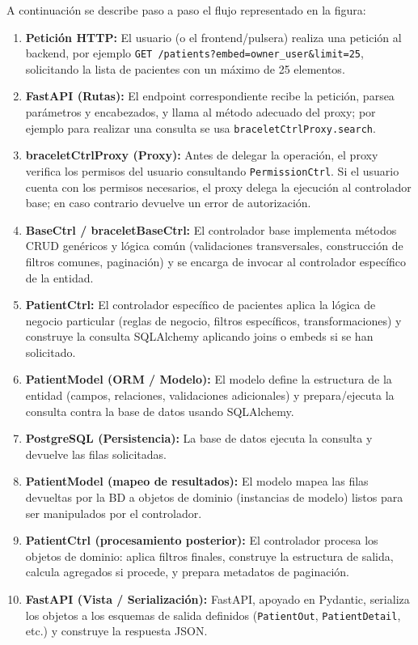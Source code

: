 \documentclass[12pt, a4paper]{article}
\begin{document}
A continuación se describe paso a paso el flujo representado en la figura:

\begin{enumerate}
	\item \textbf{Petición HTTP:} El usuario (o el frontend/pulsera) realiza una petición al backend, por ejemplo \texttt{GET /patients?embed=owner\_user\&limit=25}, solicitando la lista de pacientes con un máximo de 25 elementos.
	\item \textbf{FastAPI (Rutas):} El endpoint correspondiente recibe la petición, parsea parámetros y encabezados, y llama al método adecuado del proxy; por ejemplo para realizar una consulta se usa  \verb|braceletCtrlProxy.search|.
	\item \textbf{braceletCtrlProxy (Proxy):} Antes de delegar la operación, el proxy verifica los permisos del usuario consultando \texttt{PermissionCtrl}. Si el usuario cuenta con los permisos necesarios, el proxy delega la ejecución al controlador base; en caso contrario devuelve un error de autorización.
	\item \textbf{BaseCtrl / braceletBaseCtrl:} El controlador base implementa métodos CRUD genéricos y lógica común (validaciones transversales, construcción de filtros comunes, paginación) y se encarga de invocar al controlador específico de la entidad.
	\item \textbf{PatientCtrl:} El controlador específico de pacientes aplica la lógica de negocio particular (reglas de negocio, filtros específicos, transformaciones) y construye la consulta SQLAlchemy aplicando joins o embeds si se han solicitado.
	\item \textbf{PatientModel (ORM / Modelo):} El modelo define la estructura de la entidad (campos, relaciones, validaciones adicionales) y prepara/ejecuta la consulta contra la base de datos usando SQLAlchemy.
	\item \textbf{PostgreSQL (Persistencia):} La base de datos ejecuta la consulta y devuelve las filas solicitadas.
	\item \textbf{PatientModel (mapeo de resultados):} El modelo mapea las filas devueltas por la BD a objetos de dominio (instancias de modelo) listos para ser manipulados por el controlador.
	\item \textbf{PatientCtrl (procesamiento posterior):} El controlador procesa los objetos de dominio: aplica filtros finales, construye la estructura de salida, calcula agregados si procede, y prepara metadatos de paginación.
	\item \textbf{FastAPI (Vista / Serialización):} FastAPI, apoyado en Pydantic, serializa los objetos a los esquemas de salida definidos (\texttt{PatientOut}, \texttt{PatientDetail}, etc.) y construye la respuesta JSON.

\end{enumerate}
\end{document}
